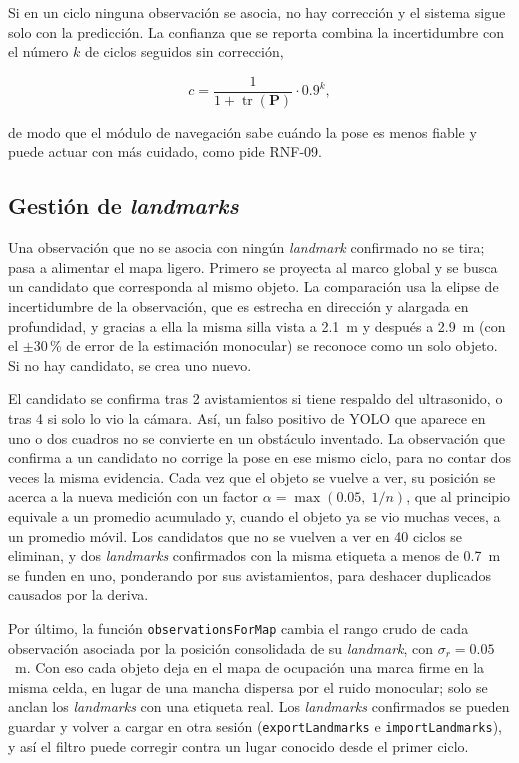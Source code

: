 Si en un ciclo ninguna observación se asocia, no hay corrección y el sistema sigue solo
con la predicción. La confianza que se reporta combina la incertidumbre con el número
$k$ de ciclos seguidos sin corrección,

\[
c = \frac{1}{1 + \operatorname{tr}(\mathbf{P})}\cdot 0.9^{k},
\]

de modo que el módulo de navegación sabe cuándo la pose es menos fiable y puede actuar
con más cuidado, como pide RNF-09.

\subsection{Gestión de \emph{landmarks}}

Una observación que no se asocia con ningún \emph{landmark} confirmado no se tira; pasa
a alimentar el mapa ligero. Primero se proyecta al marco global y se busca un candidato
que corresponda al mismo objeto. La comparación usa la elipse de incertidumbre de la
observación, que es estrecha en dirección y alargada en profundidad, y gracias a ella la
misma silla vista a 2.1~m y después a 2.9~m (con el $\pm 30$\,\% de error de la
estimación monocular) se reconoce como un solo objeto. Si no hay candidato, se crea uno
nuevo.

El candidato se confirma tras 2 avistamientos si tiene respaldo del ultrasonido, o tras
4 si solo lo vio la cámara. Así, un falso positivo de YOLO que aparece en uno o dos
cuadros no se convierte en un obstáculo inventado. La observación que confirma a un
candidato no corrige la pose en ese mismo ciclo, para no contar dos veces la misma
evidencia. Cada vez que el objeto se vuelve a ver, su posición se acerca a la nueva
medición con un factor $\alpha = \max(0.05,\; 1/n)$, que al principio equivale a un
promedio acumulado y, cuando el objeto ya se vio muchas veces, a un promedio móvil. Los
candidatos que no se vuelven a ver en 40 ciclos se eliminan, y dos \emph{landmarks}
confirmados con la misma etiqueta a menos de 0.7~m se funden en uno, ponderando por sus
avistamientos, para deshacer duplicados causados por la deriva.

Por último, la función \texttt{observationsForMap} cambia el rango crudo de cada
observación asociada por la posición consolidada de su \emph{landmark}, con
$\sigma_r = 0.05$~m. Con eso cada objeto deja en el mapa de ocupación una marca firme en
la misma celda, en lugar de una mancha dispersa por el ruido monocular; solo se anclan
los \emph{landmarks} con una etiqueta real. Los \emph{landmarks} confirmados se pueden
guardar y volver a cargar en otra sesión (\texttt{exportLandmarks} e
\texttt{importLandmarks}), y así el filtro puede corregir contra un lugar conocido desde
el primer ciclo.

